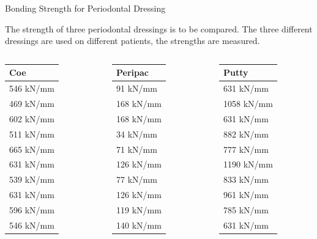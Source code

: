 \begin{frame}{Bonding Strength for Periodontal Dressing}

  The strength of three periodontal dressings is to be compared. The
  three different dressings are used on different patients, the
  strengths are measured.

  \begin{columns}
    \begin{tabular}{l}
      Coe \\ \hline
      546 kN/mm\\ 469 kN/mm\\ 602 kN/mm\\ 511 kN/mm\\ 665 kN/mm\\ 631
      kN/mm\\ 539 kN/mm\\ 631 kN/mm\\ 596 kN/mm\\ 546 kN/mm
    \end{tabular}
    \begin{tabular}{l}
      Peripac \\ \hline
      91 kN/mm\\ 168 kN/mm\\ 168 kN/mm\\ 34 kN/mm\\ 71 kN/mm\\ 126 kN/mm\\
      77 kN/mm\\ 126 kN/mm\\ 119 kN/mm\\ 140 kN/mm
    \end{tabular}

    \begin{tabular}{l}
      Putty \\ \hline
      631 kN/mm\\ 1058 kN/mm\\ 631 kN/mm\\ 882 kN/mm\\ 777 kN/mm\\
      1190 kN/mm\\ 833 kN/mm\\ 961 kN/mm\\ 785 kN/mm\\ 631 kN/mm
    \end{tabular}

  \end{columns}

\end{frame}

